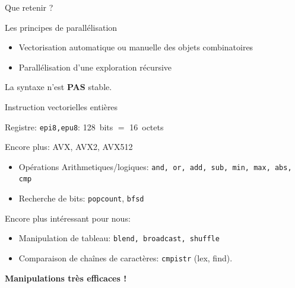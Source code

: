 \documentclass{beamer}
\begin{document}
\begin{frame}{Que retenir ?}

  \begin{NOTE}
    Les principes de parallélisation
    \begin{itemize}
    \item Vectorisation automatique ou manuelle des objets combinatoires
      \bigskip

    \item Parallélisation d'une exploration récursive
    \end{itemize}
  \end{NOTE}
  \bigskip\bigskip

  La syntaxe n'est \textbf{PAS} stable.
\end{frame}

\begin{frame}{Instruction vectorielles entières}

  Registre: \texttt{epi8,epu8}: 128~bits $=$ 16~octets
  \bigskip

  Encore plus: AVX, AVX2, AVX512
  \medskip

  \begin{itemize}
  \item Opérations Arithmetiques/logiques: \texttt{and, or, add, sub, min, max, abs, cmp}
  \item Recherche de bits: \texttt{popcount}, \texttt{bfsd}
  \end{itemize}
  \pause
  Encore plus intéressant pour nous:
  \begin{itemize}
  \item Manipulation de tableau: \texttt{blend, broadcast, shuffle}
  \item Comparaison de chaînes de caractères: \texttt{cmpistr} (lex, find).
  \end{itemize}
  \begin{tcolorbox}
    \centering
    \textbf{\large Manipulations très efficaces !}
  \end{tcolorbox}
\end{frame}
\end{document}
